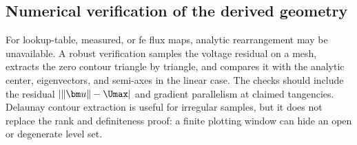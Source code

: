 \subsection{Numerical verification of the derived geometry}

For lookup-table, measured, or \gls{fe} flux maps, analytic rearrangement may
be unavailable.  A robust verification samples the voltage residual on a mesh,
extracts the zero contour triangle by triangle, and compares it with the
analytic center, eigenvectors, and semi-axes in the linear case.  The checks
should include the residual $\abs{\norm{\voltage}-\Umax}$ and gradient
parallelism at claimed tangencies.  Delaunay contour extraction is useful for
irregular samples, but it does not replace the rank and definiteness proof: a
finite plotting window can hide an open or degenerate level set.
